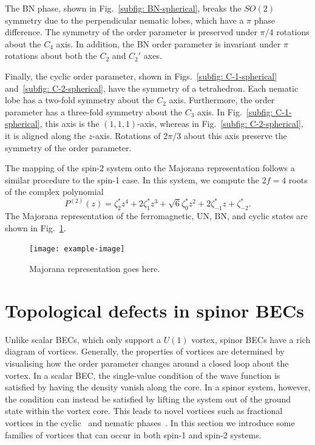 The BN phase, shown in Fig.~\ref{subfig: BN-spherical}, breaks the \(SO(2)\)
symmetry due to the perpendicular nematic lobes, which have a \(\pi \) phase
difference.
The symmetry of the order parameter is preserved under \(\pi/4\) rotations
about the \(C_4\) axis.
In addition, the BN order parameter is invariant under \(\pi \) rotations about
both the \(C_2\) and \(C_2'\) axes.

Finally, the cyclic order parameter, shown in Figs.~\ref{subfig: C-1-spherical}
and~\ref{subfig: C-2-spherical}, have the symmetry of a tetrahedron.
Each nematic lobe has a two-fold symmetry about the \(C_2\) axis.
Furthermore, the order parameter has a three-fold symmetry about the \(C_3\)
axis.
In Fig.~\ref{subfig: C-1-spherical}, this axis is the \((1, 1, 1)\)-axis,
whereas in Fig.~\ref{subfig: C-2-spherical}, it is aligned along the \(z\)-axis.
Rotations of \(2\pi/3\) about this axis preserve the symmetry of the order
parameter.

The mapping of the spin-2 system onto the Majorana representation follows a
similar procedure to the spin-1 case.
In this system, we compute the \(2f=4\) roots of the complex polynomial
\begin{equation}
    P^{(2)}(z) = \zeta_2^*z^4 + 2\zeta_1^*z^3 + \sqrt{6}\zeta_0^*z^2
    + 2\zeta_{-1}^*z + \zeta_{-2}^*.
\end{equation}
The Majorana representation of the ferromagnetic, UN, BN, and cyclic states
are shown in Fig.~\ref{fig: spin-2-Majorana}.
\begin{figure}
    \centering
    \texttt{[image: example-image]}
    \caption{\label{fig: spin-2-Majorana}Majorana representation goes here.}
\end{figure}

\section{Topological defects in spinor BECs}
Unlike scalar BECs, which only support a \(U(1)\) vortex, spinor BECs have a
rich diagram of vortices.
Generally, the properties of vortices are determined by visualising how the
order parameter changes around a closed loop about the vortex.
In a scalar BEC, the single-value condition of the wave function is satisfied
by having the density vanish along the core.
In a spinor system, however, the condition can instead be satisfied by lifting
the system out of the ground state within the vortex core.
This leads to novel vortices such as fractional vortices in the
cyclic~\cite{Semenoff2007,Huhtamaki2009} and nematic
phases~\cite{Leonhardt2000, Seo2015}.
In this section we introduce some families of vortices that can occur
in both spin-1 and spin-2 systems.

